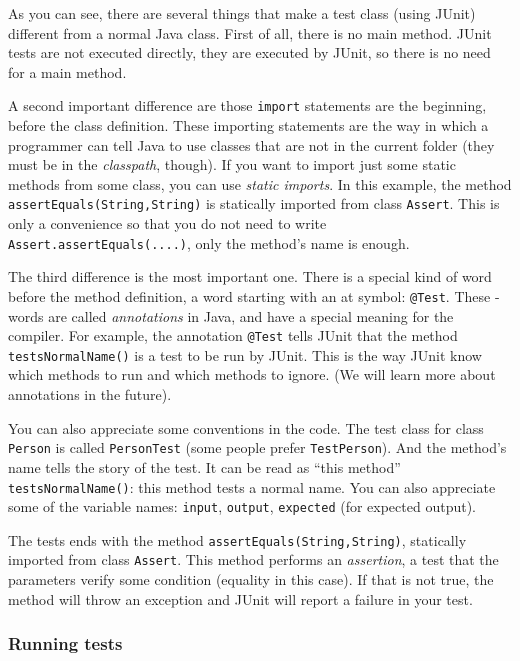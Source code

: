 As you can see, there are several things that make a test class (using
JUnit) different from a normal Java class. First of all, there is no
main method. JUnit tests are not executed directly, they are executed
by JUnit, so there is no need for a main method. 

A second important difference are those \verb+import+ statements are
the beginning, before the class definition. These importing statements
are the way in which a programmer can tell Java to use classes that
are not in the current folder (they must be in the \emph{classpath},
though). If you want to import just some static methods from some
class, you can use \emph{static imports}. In this example, the method
\verb+assertEquals(String,String)+ is statically imported from class
\verb+Assert+. This is only a convenience so that you do not need to
write \verb+Assert.assertEquals(....)+, only the method's name is
enough. 

The third difference is the most important one. There is a special
kind of word before the method definition, a word starting with an at
symbol: \verb+@Test+. These \@-words are called \emph{annotations} in
Java, and have a special meaning for the compiler. For example, the
annotation \verb+@Test+ tells JUnit that the method
\verb+testsNormalName()+ is a test to be run by JUnit. This is the way
JUnit know which methods to run and which methods to ignore. (We will
learn more about annotations in the future).

You can also appreciate some conventions in the code. The test class
for class \verb+Person+ is called \verb+PersonTest+ (some people
prefer \verb+TestPerson+). And the method's name tells the story of
the test. It can be read as ``this method'' \verb+testsNormalName()+:
this method tests a normal name. You can also appreciate some of the
variable names: \verb+input+, \verb+output+, \verb+expected+ (for
expected output). 

The tests ends with the method \verb+assertEquals(String,String)+,
statically imported from class \verb+Assert+. This method performs an
\emph{assertion}, a test that the parameters verify some condition
(equality in this case). If that is not true, the method will throw an
exception and JUnit will report a failure in your test. 

\subsubsection{Running tests}
\label{sec:running-tests}

